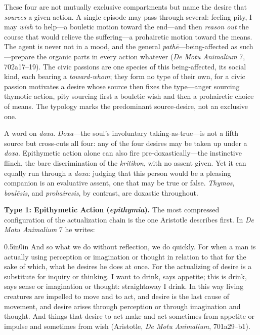These four are not mutually exclusive compartments but name the desire that \textit{sources} a given action. A single episode may pass through several: feeling pity, I may \textit{wish} to help---a bouletic motion toward the end---and then \textit{reason out} the course that would relieve the suffering---a prohairetic motion toward the means. The agent is never not in a mood, and the general \textit{pathē}---being-affected as such---prepare the organic parts in every action whatever (\textit{De Motu Animalium} 7, 702a17--19). The civic passions are one species of this being-affected, its social kind, each bearing a \textit{toward-whom}; they form no type of their own, for a civic passion motivates a desire whose source then fixes the type---anger sourcing thymotic action, pity sourcing first a bouletic wish and then a prohairetic choice of means. The typology marks the predominant source-desire, not an exclusive one.

A word on \textit{doxa}. \textit{Doxa}---the soul's involuntary taking-as-true---is not a fifth source but cross-cuts all four: any of the four desires may be taken up under a \textit{doxa}. Epithymetic action alone can also fire pre-doxastically---the instinctive flinch, the bare discrimination of the \textit{kritikon}, with no assent given. Yet it can equally run through a \textit{doxa}: judging that this person would be a pleasing companion is an evaluative assent, one that may be true or false. \textit{Thymos}, \textit{boulēsis}, and \textit{prohairesis}, by contrast, are doxastic throughout.

\textbf{Type 1: Epithymetic Action (\textit{epithymia}).} The most compressed configuration of the actualization chain is the one Aristotle describes first. In \textit{De Motu Animalium} 7 he writes:

\begin{adjustwidth}{0.5in}{0in}
And so what we do without reflection, we do quickly. For when a man is actually using perception or imagination or thought in relation to that for the sake of which, what he desires he does at once. For the actualizing of desire is a substitute for inquiry or thinking. I want to drink, says appetite; this is drink, says sense or imagination or thought: straightaway I drink. In this way living creatures are impelled to move and to act, and desire is the last cause of movement, and desire arises through perception or through imagination and thought. And things that desire to act make and act sometimes from appetite or impulse and sometimes from wish (Aristotle, \textit{De Motu Animalium}, 701a29--b1).
\end{adjustwidth}

